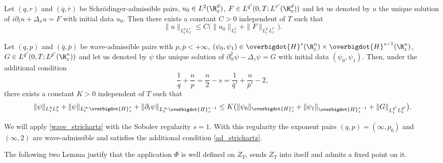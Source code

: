 \skpt
\begin{proposition}\label{strichartz}
\begin{enumeratei}
\item
Let $(q,r)$ and $(\bar{q},\bar{r})$ be Schrödinger-admissible pairs, $u_{0}\in L^{2}(\R_{x}^{d})$, $F\in L^{\bar{q}'}(0,T;L^{\bar{r}'}(\R_{x}^{d}))$ and let us denoted by $u$ the unique solution of $i\partial_{t}u+\Delta_{x}u=F$ with initial data $u_{0}$. Then there exists a constant $C>0$ independent of $T$ such that
\begin{equation}\label{schro_strichartz}
\|u\|_{L_{t}^{q}L_{x}^{r}}\leq C\bigl(\|u_{0}\|_{L_{x}^{2}}+\|F\|_{L_{t}^{\bar{q}'}L_{x}^{\bar{r}'}}\bigr).
\end{equation}

\item
Let $(q,p)$ and $(\bar{q},\bar{p})$ be wave-admissible pairs with $p,\bar{p}<+\infty$, $(\psi_{0},\psi_{1})\in\overbigdot{H}^{s}(\R_{z}^{n})\times\overbigdot{H}^{s-1}(\R_{z}^{n})$, $G\in L^{\bar{q}'}(0,T;L^{\bar{p}'}(\R_{z}^{n}))$ and let us denoted by $\psi$ the unique solution of $\partial_{tt}^{2}\psi-\Delta_{z}\psi=G$ with initial data $(\psi_{0},\psi_{1})$. Then, under the additional condition
\begin{equation}\label{ad_strichartz}
\frac{1}{q}+\frac{n}{p}=\frac{n}{2}-s=\frac{1}{\bar{q}'}+\frac{n}{\bar{p}'}-2,
\end{equation}
there exists a constant $K>0$ independent of $T$ such that
\begin{equation}\label{wave_strichartz}
\|\psi\|_{L_{t}^{q}L_{z}^{p}}+\|\psi\|_{L_{t}^{\infty}\overbigdot{H}_{z}^{s}}+\|\partial_{t}\psi\|_{L_{t}^{\infty}\overbigdot{H}_{z}^{s-1}}\leq K\bigl(\|\psi_{0}\|_{\overbigdot{H}_{z}^{s}}+\|\psi_{1}\|_{\overbigdot{H}_{z}^{s-1}}+\|G\|_{L_{t}^{\bar{q}'}L_{z}^{\bar{p}'}}\bigr).
\end{equation}
\end{enumeratei}
\end{proposition}

\begin{rmk}
We will apply \eqref{wave_strichartz} with the Sobolev regularity $s=1$. With this regularity the exponent pairs $(q,p)=(\infty,p_{0})$ and $(\infty,2)$ are wave-admissible and satisfies the additional condition \eqref{ad_strichartz}.
\end{rmk}

The following two Lemma justify that the application $\Phi$ is well defined on $Z_{T}$, sends $Z_{T}$ into itself and admits a fixed point on it.

